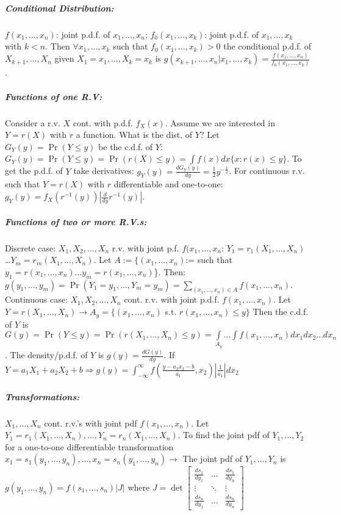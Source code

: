 \documentclass[landscape,10pt]{article}
\begin{document}
\begin{multicols}{4}
\subparagraph*{Conditional Distribution: }
 \(f(x_1, \ldots, x_n)\): joint p.d.f. of \(x_1, \ldots, x_n\); \(f_0(x_1, \ldots, x_k)\): joint p.d.f. of \(x_1, \ldots, x_k\) with \(k < n\). Then \(\forall x_1,\ldots, x_k\) such that \(f_0(x_1, \ldots, x_k) > 0\) the conditional p.d.f. of \(X_{k+1},\ldots,X_n\) given \(X_1 = x_1, \ldots, X_k = x_k\) is \(g(x_{k+1},\ldots,x_n | x_1, \ldots, x_k) = \frac{f(x_1, \ldots, x_n)}{f_0(x_1, \ldots, x_k)}\).

 \subparagraph*{Functions of one R.V: }
    Consider a r.v. \(X\) cont. with p.d.f. \(f_X(x)\). Assume we are interested in \(Y=r(X)\) with \(r\) a function. What is the dist. of \(Y\)? Let \(G_Y(y) = \Pr(Y \leq y)\) be the c.d.f. of \(Y\): \(G_Y(y) = \Pr(Y \leq y) = \Pr(r(X) \leq y) = \int{f(x)}dx \{x: r(x) \leq y\} \). To get the p.d.f. of \(Y\) take derivatives: \(g_Y(y) = \frac{dG_Y(y)}{dy} = \frac{1}{2} y^{-\frac{1}{2}}\). For continuous r.v. such that \(Y = r(X)\) with \(r\) differentiable and one-to-one: \(g_Y(y) = f_X(r^{-1}(y))\left|\frac{d}{dy} r^{-1} (y) \right|\).

\subparagraph*{Functions of two or more R.V.s:}
 Discrete case: \(X_1, X_2, \ldots, X_n\) r.v. with joint p.f. \(f(x_1, \ldots, x_n\):
\(Y_1 = r_1(X_1,\ldots,X_n)\) \dots \(Y_m = r_m(X_1,\ldots,X_n)\). Let \(A := \{(x_1,\ldots,x_n)\):= such that \(y_1 = r(x_1,\ldots,x_n) \dots y_m = r(x_1,\ldots,x_n)\)\}. Then: \(g(y_1,\ldots,y_m)=\Pr(Y_1=y_1,\ldots,Y_m=y_m)=\sum\limits_{(x_1,\ldots,x_n)\in A}{f(x_1,\ldots,x_n)}\). \\

Continuous case: \(X_1, X_2, \ldots, X_n\) cont. r.v. with joint p.d.f. \(f(x_1, \ldots, x_n)\). Let \(Y = r(X_1,\ldots,X_n) \rightarrow A_y = \{(x_1,\ldots,x_n)\) s.t. \(r(x_1,\ldots,x_n) \leq y\}\) Then the c.d.f. of \(Y\) is \(G(y) = \Pr(Y \leq y) = \Pr\left( r(X_1,\ldots,X_n) \leq y \right) = \int\limits_{A_y}\ldots\int{f(x_1,\ldots,x_n)}dx_1dx_2\ldots dx_n\). The density/p.d.f. of \(Y\) is \(g(y) = \frac{dG(y)}{dy}\). If \(Y = a_1 X_1 + a_2 X_2 + b \Rightarrow g(y) = \int_{-\infty}^{\infty}f\left(\frac{y-a_2 x_2 - b}{a_1},x_2\right)\left|\frac{1}{a_1}\right|dx_2\)

\subparagraph*{Transformations: }
 \(X_1,\ldots,X_n\) cont. r.v.'s with joint pdf \(f(x_1,\ldots,x_n)\). Let \(Y_1 = r_1(X_1,\ldots,X_n), \dots, Y_n = r_n (X_1, \ldots, X_n)\). To find the joint pdf of \(Y_1, \ldots, Y_2\) for a one-to-one differentiable transformation \(x_1 = s_1 (y_1,\ldots,y_n), \dots, x_n = s_n (y_1, \ldots, y_n) \rightarrow \) The joint pdf of \(Y_1,\ldots,Y_n\) is \(g(y_1,\ldots,y_n) = f(s_1,\ldots,s_n)\left|J\right|\) where \(J = \det \begin{bmatrix}
    \frac{ds_1}{dy_1} & \dots & \frac{ds_1}{dy_n} \\
    \vdots & \ddots & \vdots \\
     \frac{ds_n}{dy_1} & \hdots & \frac{ds_n}{dy_n}
 \end{bmatrix}
 \)


\end{multicols}
\end{document}
